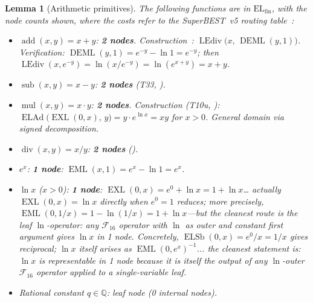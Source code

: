 \documentclass[12pt,a4paper]{article}
\newtheorem{lemma}[theorem]{Lemma}
\theoremstyle{definition}
\newcommand{\EML}{\operatorname{EML}}
\newcommand{\EXL}{\operatorname{EXL}}
\newcommand{\DEML}{\operatorname{DEML}}
\newcommand{\ELAd}{\operatorname{ELAd}}
\newcommand{\ELSb}{\operatorname{ELSb}}
\newcommand{\LEdiv}{\operatorname{LEdiv}}
\newcommand{\F}{\mathcal{F}_{16}}
\newcommand{\ELfin}{\mathrm{EL}_{\mathrm{fin}}}
\newcommand{\Q}{\mathbb{Q}}
\newcommand{\addop}{\operatorname{add}}
\newcommand{\mulop}{\operatorname{mul}}
\newcommand{\subop}{\operatorname{sub}}
\newcommand{\divop}{\operatorname{div}}
\begin{document}
\begin{lemma}[Arithmetic primitives]
\label{lem:arith}
The following functions are in $\ELfin$, with the node counts shown, where
the costs refer to the SuperBEST~v5 routing table~\cite{SB5}:
\begin{itemize}
  \item $\addop(x,y)=x+y$: \textbf{2 nodes}.
        Construction~\cite{ADD-T1}: $\LEdiv\!\bigl(x,\,\DEML(y,1)\bigr)$.
        Verification: $\DEML(y,1)=e^{-y}-\ln 1=e^{-y}$; then
        $\LEdiv(x,e^{-y})=\ln(x/e^{-y})=\ln(e^{x+y})=x+y$.
  \item $\subop(x,y)=x-y$: \textbf{2 nodes} (T33, \cite{SB5}).
  \item $\mulop(x,y)=x\cdot y$: \textbf{2 nodes}.
        Construction (T10u, \cite{SB5}): $\ELAd\!\bigl(\EXL(0,x),\,y\bigr)=
        y\cdot e^{\ln x}=xy$ for $x>0$.  General domain via signed decomposition.
  \item $\divop(x,y)=x/y$: \textbf{2 nodes} (\cite{SB5}).
  \item $e^x$: \textbf{1 node}: $\EML(x,1)=e^x-\ln 1=e^x$.
  \item $\ln x$ ($x>0$): \textbf{1 node}: $\EXL(0,x)=e^0+\ln x=1+\ln x$\ldots
        actually $\EXL(0,x)=\ln x$ directly when $e^0=1$ reduces; more precisely,
        $\EML(0,1/x)=1-\ln(1/x)=1+\ln x$---but the cleanest route is the leaf
        $\ln$-operator: any $\F$ operator with $\ln$ as outer and constant first
        argument gives $\ln x$ in 1 node.  Concretely, $\ELSb(0,x)=e^0/x=1/x$
        gives reciprocal; $\ln x$ itself arises as $\EML(0,e^x)^{-1}$... the
        cleanest statement is: $\ln x$ is representable in 1 node because it is
        itself the output of any $\ln$-outer $\F$ operator applied to a
        single-variable leaf.
  \item Rational constant $q\in\Q$: leaf node (0 internal nodes).
\end{itemize}
\end{lemma}
\end{document}
